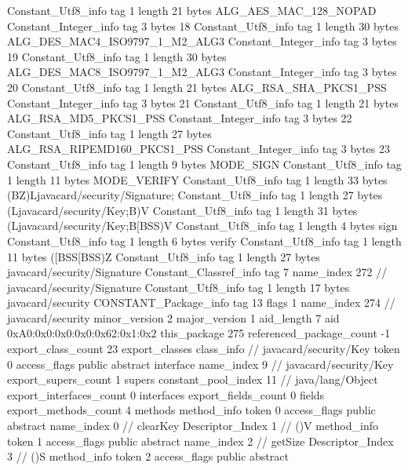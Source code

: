 {{{		}
		Constant_Utf8_info {
			tag	1
			length	21
			bytes	ALG_AES_MAC_128_NOPAD
		}
		Constant_Integer_info {
			tag	3
			bytes	18
		}
		Constant_Utf8_info {
			tag	1
			length	30
			bytes	ALG_DES_MAC4_ISO9797_1_M2_ALG3
		}
		Constant_Integer_info {
			tag	3
			bytes	19
		}
		Constant_Utf8_info {
			tag	1
			length	30
			bytes	ALG_DES_MAC8_ISO9797_1_M2_ALG3
		}
		Constant_Integer_info {
			tag	3
			bytes	20
		}
		Constant_Utf8_info {
			tag	1
			length	21
			bytes	ALG_RSA_SHA_PKCS1_PSS
		}
		Constant_Integer_info {
			tag	3
			bytes	21
		}
		Constant_Utf8_info {
			tag	1
			length	21
			bytes	ALG_RSA_MD5_PKCS1_PSS
		}
		Constant_Integer_info {
			tag	3
			bytes	22
		}
		Constant_Utf8_info {
			tag	1
			length	27
			bytes	ALG_RSA_RIPEMD160_PKCS1_PSS
		}
		Constant_Integer_info {
			tag	3
			bytes	23
		}
		Constant_Utf8_info {
			tag	1
			length	9
			bytes	MODE_SIGN
		}
		Constant_Utf8_info {
			tag	1
			length	11
			bytes	MODE_VERIFY
		}
		Constant_Utf8_info {
			tag	1
			length	33
			bytes	(BZ)Ljavacard/security/Signature;
		}
		Constant_Utf8_info {
			tag	1
			length	27
			bytes	(Ljavacard/security/Key;B)V
		}
		Constant_Utf8_info {
			tag	1
			length	31
			bytes	(Ljavacard/security/Key;B[BSS)V
		}
		Constant_Utf8_info {
			tag	1
			length	4
			bytes	sign
		}
		Constant_Utf8_info {
			tag	1
			length	6
			bytes	verify
		}
		Constant_Utf8_info {
			tag	1
			length	11
			bytes	([BSS[BSS)Z
		}
		Constant_Utf8_info {
			tag	1
			length	27
			bytes	javacard/security/Signature
		}
		Constant_Classref_info {
			tag	7
			name_index	272		// javacard/security/Signature
		}
		Constant_Utf8_info {
			tag	1
			length	17
			bytes	javacard/security
		}
		CONSTANT_Package_info {
			tag	13
			flags	1
			name_index	274		// javacard/security
			minor_version	2
			major_version	1
			aid_length	7
			aid	0xA0:0x0:0x0:0x0:0x62:0x1:0x2
		}
	}
	this_package	275
	referenced_package_count	-1
	export_class_count	23
	export_classes {
		class_info {		// javacard/security/Key
			token	0
			access_flags	public abstract interface
			name_index	9		// javacard/security/Key
			export_supers_count	1
			supers {
				constant_pool_index	11		// java/lang/Object
			}
			export_interfaces_count	0
			interfaces {
			}
			export_fields_count	0
			fields {
			}
			export_methods_count	4
			methods {
				method_info {
					token	0
					access_flags	public abstract
					name_index	0		// clearKey
					Descriptor_Index	1		// ()V
				}
				method_info {
					token	1
					access_flags	public abstract
					name_index	2		// getSize
					Descriptor_Index	3		// ()S
				}
				method_info {
					token	2
					access_flags	public abstract
}}}}}

